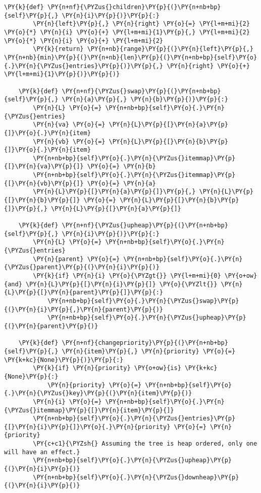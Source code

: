 \begin{Verbatim}[commandchars=\\\{\}]
    \PY{k}{def} \PY{n+nf}{\PYZus{}children}\PY{p}{(}\PY{n+nb+bp}{self}\PY{p}{,} \PY{n}{i}\PY{p}{)}\PY{p}{:}
        \PY{n}{left}\PY{p}{,} \PY{n}{right} \PY{o}{=} \PY{l+m+mi}{2} \PY{o}{*} \PY{n}{i} \PY{o}{+} \PY{l+m+mi}{1}\PY{p}{,} \PY{l+m+mi}{2} \PY{o}{*} \PY{n}{i} \PY{o}{+} \PY{l+m+mi}{2}
        \PY{k}{return} \PY{n+nb}{range}\PY{p}{(}\PY{n}{left}\PY{p}{,} \PY{n+nb}{min}\PY{p}{(}\PY{n+nb}{len}\PY{p}{(}\PY{n+nb+bp}{self}\PY{o}{.}\PY{n}{\PYZus{}entries}\PY{p}{)}\PY{p}{,} \PY{n}{right} \PY{o}{+} \PY{l+m+mi}{1}\PY{p}{)}\PY{p}{)}

    \PY{k}{def} \PY{n+nf}{\PYZus{}swap}\PY{p}{(}\PY{n+nb+bp}{self}\PY{p}{,} \PY{n}{a}\PY{p}{,} \PY{n}{b}\PY{p}{)}\PY{p}{:}
        \PY{n}{L} \PY{o}{=} \PY{n+nb+bp}{self}\PY{o}{.}\PY{n}{\PYZus{}entries}
        \PY{n}{va} \PY{o}{=} \PY{n}{L}\PY{p}{[}\PY{n}{a}\PY{p}{]}\PY{o}{.}\PY{n}{item}
        \PY{n}{vb} \PY{o}{=} \PY{n}{L}\PY{p}{[}\PY{n}{b}\PY{p}{]}\PY{o}{.}\PY{n}{item}
        \PY{n+nb+bp}{self}\PY{o}{.}\PY{n}{\PYZus{}itemmap}\PY{p}{[}\PY{n}{va}\PY{p}{]} \PY{o}{=} \PY{n}{b}
        \PY{n+nb+bp}{self}\PY{o}{.}\PY{n}{\PYZus{}itemmap}\PY{p}{[}\PY{n}{vb}\PY{p}{]} \PY{o}{=} \PY{n}{a}
        \PY{n}{L}\PY{p}{[}\PY{n}{a}\PY{p}{]}\PY{p}{,} \PY{n}{L}\PY{p}{[}\PY{n}{b}\PY{p}{]} \PY{o}{=} \PY{n}{L}\PY{p}{[}\PY{n}{b}\PY{p}{]}\PY{p}{,} \PY{n}{L}\PY{p}{[}\PY{n}{a}\PY{p}{]}

    \PY{k}{def} \PY{n+nf}{\PYZus{}upheap}\PY{p}{(}\PY{n+nb+bp}{self}\PY{p}{,} \PY{n}{i}\PY{p}{)}\PY{p}{:}
        \PY{n}{L} \PY{o}{=} \PY{n+nb+bp}{self}\PY{o}{.}\PY{n}{\PYZus{}entries}
        \PY{n}{parent} \PY{o}{=} \PY{n+nb+bp}{self}\PY{o}{.}\PY{n}{\PYZus{}parent}\PY{p}{(}\PY{n}{i}\PY{p}{)}
        \PY{k}{if} \PY{n}{i} \PY{o}{\PYZgt{}} \PY{l+m+mi}{0} \PY{o+ow}{and} \PY{n}{L}\PY{p}{[}\PY{n}{i}\PY{p}{]} \PY{o}{\PYZlt{}} \PY{n}{L}\PY{p}{[}\PY{n}{parent}\PY{p}{]}\PY{p}{:}
            \PY{n+nb+bp}{self}\PY{o}{.}\PY{n}{\PYZus{}swap}\PY{p}{(}\PY{n}{i}\PY{p}{,}\PY{n}{parent}\PY{p}{)}
            \PY{n+nb+bp}{self}\PY{o}{.}\PY{n}{\PYZus{}upheap}\PY{p}{(}\PY{n}{parent}\PY{p}{)}

    \PY{k}{def} \PY{n+nf}{changepriority}\PY{p}{(}\PY{n+nb+bp}{self}\PY{p}{,} \PY{n}{item}\PY{p}{,} \PY{n}{priority} \PY{o}{=} \PY{k+kc}{None}\PY{p}{)}\PY{p}{:}
        \PY{k}{if} \PY{n}{priority} \PY{o+ow}{is} \PY{k+kc}{None}\PY{p}{:}
            \PY{n}{priority} \PY{o}{=} \PY{n+nb+bp}{self}\PY{o}{.}\PY{n}{\PYZus{}key}\PY{p}{(}\PY{n}{item}\PY{p}{)}
        \PY{n}{i} \PY{o}{=} \PY{n+nb+bp}{self}\PY{o}{.}\PY{n}{\PYZus{}itemmap}\PY{p}{[}\PY{n}{item}\PY{p}{]}
        \PY{n+nb+bp}{self}\PY{o}{.}\PY{n}{\PYZus{}entries}\PY{p}{[}\PY{n}{i}\PY{p}{]}\PY{o}{.}\PY{n}{priority} \PY{o}{=} \PY{n}{priority}
        \PY{c+c1}{\PYZsh{} Assuming the tree is heap ordered, only one will have an effect.}
        \PY{n+nb+bp}{self}\PY{o}{.}\PY{n}{\PYZus{}upheap}\PY{p}{(}\PY{n}{i}\PY{p}{)}
        \PY{n+nb+bp}{self}\PY{o}{.}\PY{n}{\PYZus{}downheap}\PY{p}{(}\PY{n}{i}\PY{p}{)}


\end{Verbatim}
